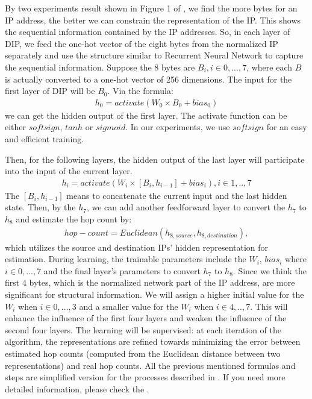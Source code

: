 By two experiments result shown in Figure 1 of \citet{dip}, we  find the more bytes for an IP address, the better we can constrain the representation of the IP. This shows the sequential information contained by the IP addresses.  So, in each layer of DIP, we feed the one-hot vector of the eight bytes from the  normalized IP separately and use the structure similar to Recurrent Neural Network to capture the sequential information. Suppose the 8 bytes are $B_i, i \in {0, ..., 7}$, where each $B$ is actually converted to a one-hot vector of 256 dimensions. The input for the first layer of DIP will be $B_0$. Via  the formula:
\begin{align} 
h_{0}=activate(W_0 \times B_0 + bias_0)
\end{align}
we can get the hidden output of the first layer. The activate function can be either $softsign$, $tanh$ or $sigmoid$. In our experiments, we use $softsign$ for an easy and efficient training.

Then, for the following layers, the hidden output of the last layer will participate into the input of the current layer. 
\begin{align} 
h_{i}=activate(W_i \times [B_i, h_{i-1}] + bias_i), i \in {1, .. , 7} 
\end{align}
The $[B_i, h_{i-1}]$ means to concatenate the current input and the last hidden state. 
Then, by the $h_7$, we can add another feedforward layer to convert the $h_7$ to $h_8$ and estimate the hop count by:
\begin{align} 
hop-count = Euclidean (h_{8,source}, h_{8, destination}),
\end{align}
which utilizes the source and destination IPs' hidden representation for estimation. During learning, the trainable parameters include the $W_i$, $bias_i$ where $i\in {0,...,7}$ and the final layer's parameters to convert $h_7$ to $h_8$. Since we think the first 4 bytes, which is the normalized network part of the IP address, are more significant for structural information. We will assign a higher initial value for the $W_i$ when $i\in {0,...,3}$ and a smaller value for the $W_i$ when $i \in {4,..,7}$. This will enhance the influence of the first four layers and weaken the influence of the second four layers. The learning will be supervised: at each iteration of the algorithm, the representations are refined towards minimizing the error between estimated hop counts (computed from the Euclidean distance between two representations) and real hop counts. 
All the previous mentioned formulas and steps are simplified version for the processes described in \citet{dip}. If you need more detailed information, please check the \citet{dip}. 

